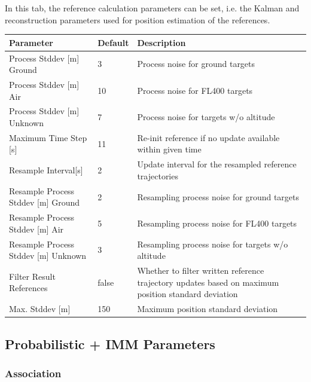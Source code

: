 In this tab, the reference calculation parameters can be set, i.e. the Kalman and reconstruction parameters used for position estimation of the references. \\

\begin{table}[H]
  \center
  \begin{tabularx}{\textwidth}{ | l | l | X |}
    \hline
    \textbf{Parameter} & \textbf{Default} &  \textbf{Description} \\ \hline
    Process Stddev [m] Ground & 3 & Process noise for ground targets \\ \hline
    Process Stddev [m] Air & 10 & Process noise for FL400 targets \\ \hline
    Process Stddev [m] Unknown & 7 & Process noise for targets w/o altitude \\ \hline
    Maximum Time Step [s] & 11 & Re-init reference if no update available within given time \\ \hline
    Resample Interval[s] & 2 & Update interval for the resampled reference trajectories \\ \hline
    Resample Process Stddev [m] Ground & 2 & Resampling process noise for ground targets \\ \hline
    Resample Process Stddev [m] Air & 5 & Resampling process noise for FL400 targets \\ \hline
    Resample Process Stddev [m] Unknown & 3 & Resampling process noise for targets w/o altitude \\ \hline    
    Filter Result References& false & Whether to filter written reference trajectory updates based on maximum position standard deviation \\ \hline
    Max. Stddev [m] & 150 & Maximum position standard deviation \\ \hline
  \end{tabularx}
\end{table}

\subsection{Probabilistic + IMM Parameters}

\subsubsection{Association}


